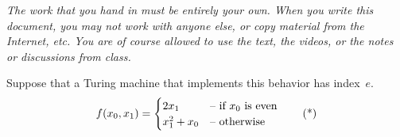 \documentclass[answers, nolegalese]{examjh}
\begin{document}
\thispagestyle{empty}
\vspace*{1ex}
\begin{center}
 \parbox{0.95\textwidth}{\textit{
  The work that you hand in must be entirely your own. 
  When you write this document, you may not work with anyone else,
  or copy material from the Internet, etc.
  You are of course allowed to use the text, the videos, or the notes
  or discussions from class.
  }}
\end{center}
\vspace*{1ex}
\begin{questions}
\question
Suppose that a Turing machine that implements this behavior has index~$e$.
\begin{equation*}
  f(x_0,x_1)=
  \begin{cases}
    2x_1  &\text{-- if $x_0$ is even}  \\
    x_1^2+x_0 &\text{-- otherwise} 
  \end{cases}
  \tag{*}
\end{equation*}
\end{questions}
\end{document}
